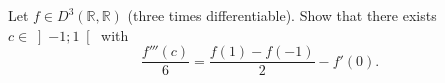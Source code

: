 \begin{problem}
    Let \( f \in D^3\left(\mathbb{R},\mathbb{R}\right) \) (three times differentiable). Show that there exists \( c \in \left]-1;1\right[ \) with
    \[
        \frac{f'''\left(c\right)}{6} = \frac{f\left(1\right)-f\left(-1\right)}{2}-f'\left(0\right).
    \]
\end{problem}
